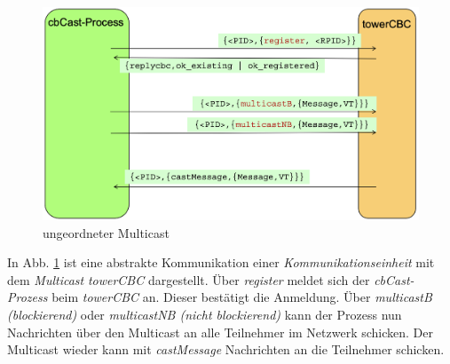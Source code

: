 \begin{figure}[htbp]
\begin{center}
\includegraphics[scale=0.4]{Latex/Bilder/towerCBC_1.png}
\caption{\label{fig:towerCBC} ungeordneter Multicast \cite{Aufgabenstellung}} 
\end{center}
\end{figure}

In Abb. \ref{fig:towerCBC} ist eine abstrakte Kommunikation einer \textit{Kommunikationseinheit} mit dem \textit{Multicast} \textit{towerCBC} dargestellt. Über \textit{register} meldet sich der \textit{cbCast-Prozess} beim \textit{towerCBC} an. Dieser bestätigt die Anmeldung. Über \textit{multicastB (blockierend)} oder \textit{multicastNB (nicht blockierend)} kann der Prozess nun Nachrichten über den Multicast an alle Teilnehmer im Netzwerk schicken. Der Multicast wieder kann mit \textit{castMessage} Nachrichten an die Teilnehmer schicken.

